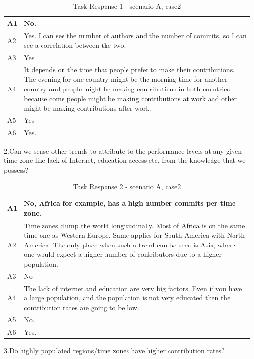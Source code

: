 \documentclass[double,12pt]{beavtex}
\begin{document}
\begin{appendices}
\begin{table}[H]
\begin{tabular}{ |p{2cm}|p{12cm}| }
 \hline
 A1 & No.\\
 \hline
 A2 & Yes. I can see the number of authors and the number of commits, so I can see a correlation between the two.\\ \hline
 A3 & Yes\\ \hline
 A4 & It depends on the time that people prefer to make their contributions. The evening for one country might be the morning time for another country and people might be making contributions in both countries because come people might be making contributions at work and other might be making contributions after work.\\ \hline
 A5 & Yes\\ \hline
 A6 & Yes.\\
 \hline
\end{tabular}
\caption{Task Response 1 - scenario A, case2}
\label{tab:table11}
\end{table}

2.Can we sense other trends to attribute to the performance levels at any given time zone like lack of Internet, education access etc. from the knowledge that we possess?

\begin{table}[H]
\begin{tabular}{ |p{2cm}|p{12cm}| }
 \hline
 A1 & No, Africa for example, has a high number commits per time zone.\\
 \hline
 A2 & Time zones clump the world longitudinally. Most of Africa is on the same time one as Western Europe. Same applies for South America with North America. The only place when such a trend can be seen is Asia, where one would expect a higher number of contributors due to a higher population.\\ \hline
 A3 & No\\ \hline
 A4 & The lack of internet and education are very big factors. Even if you have a large population, and the population is not very educated then the contribution rates are going to be low.\\ \hline
 A5 & No.\\ \hline
 A6 & Yes.\\
 \hline
\end{tabular}
\caption{Task Response 2 - scenario A, case2}
\label{tab:table12}
\end{table}

3.Do highly populated regions/time zones have higher contribution rates?


\end{appendices}
\end{document}
